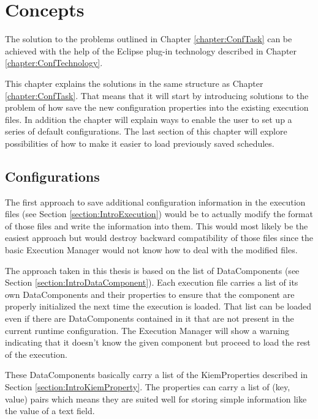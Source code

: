 \chapter{Concepts}
\label{chapter:ConfConcepts}
The solution to the problems outlined in Chapter \ref{chapter:ConfTask} can be achieved with
the help of the Eclipse plug-in technology described in Chapter \ref{chapter:ConfTechnology}.

This chapter explains the solutions in the same structure as Chapter \ref{chapter:ConfTask}.
That means that it will start by introducing solutions to the problem of how save the new
configuration properties into the existing execution files. In addition the chapter will
explain ways to enable the user to set up a series of default configurations. The last
section of this chapter will explore possibilities of how to make it easier to load
previously saved schedules.

\section{Configurations}
\label{section:ConfConceptsConf}
The first approach to save additional configuration information in the execution files (see Section \ref{section:IntroExecution}) would
be to actually modify the format of those files and write the information into them.
This would most likely be the easiest approach but would destroy backward compatibility of
those files since the basic Execution Manager would not know how to deal with the modified files.

The approach taken in this thesis is based on the list of DataComponents (see Section \ref{section:IntroDataComponent}). Each execution file 
carries a list of its own DataComponents and their properties to ensure
that the component are properly initialized the next time the execution is loaded. That list
can be loaded even if there are DataComponents contained in it that are not present in the current
runtime configuration. The Execution Manager will show a warning indicating that it doesn't know the given
component but proceed to load the rest of the execution. 

These DataComponents basically carry a list of the KiemProperties described in Section \ref{section:IntroKiemProperty}.
The properties can carry a list of (key, value) pairs which means they are suited well for storing simple information like the value
of a text field.

